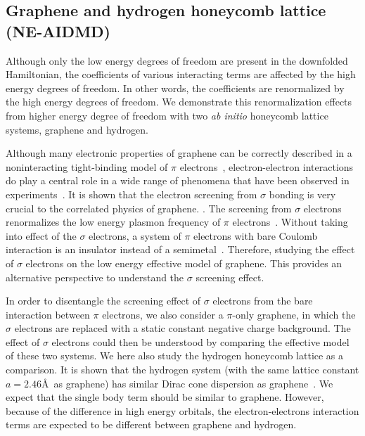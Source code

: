 %
\subsection{Graphene and hydrogen honeycomb lattice (NE-AIDMD)}
Although only the low energy degrees of freedom are present in the downfolded Hamiltonian, the coefficients of various interacting terms are affected by the high energy degrees of freedom. In other words, the coefficients are renormalized by the high energy degrees of freedom. We demonstrate this renormalization effects from higher energy degree of freedom with two \textit{ab initio} honeycomb lattice  systems, graphene and hydrogen. 

Although many electronic properties of graphene can be correctly described in a noninteracting tight-binding model of $\pi$ electrons~\cite{Castro2009}, electron-electron interactions do play a central role in a wide range of phenomena that have been observed in experiments~\cite{Kotov2012}. It is shown that the electron screening from $\sigma$ bonding is very crucial to the correlated physics of graphene. \cite{Zheng2016}. The screening from $\sigma$ electrons renormalizes the low energy plasmon frequency of $\pi$ electrons~\cite{Zheng2016}. Without taking into effect of the $\sigma$ electrons, a system of $\pi$ electrons with bare Coulomb interaction is an insulator instead of a semimetal~\cite{DrutPRL2009, DrutPRB2009,  Smith2014, Zheng2016}. Therefore, studying the effect of $\sigma$ electrons on the low energy effective model of graphene. This provides an alternative perspective to understand the $\sigma$ screening effect. 

In order to disentangle the screening effect of $\sigma$ electrons from the bare interaction between $\pi$ electrons, we also consider a $\pi$-only graphene, in which the $\sigma$ electrons are replaced with a static constant negative charge background. The effect of $\sigma$ electrons could then be understood by comparing the effective model of these two systems. 
We here also study the hydrogen honeycomb lattice as a comparison. It is shown that the hydrogen system (with the same lattice constant $a=2.46$\AA~as graphene) has similar Dirac cone dispersion as graphene~\cite{Zheng2016}. We expect that the single body term should be similar to graphene. However, because of the difference in high energy orbitals, the electron-electrons interaction terms are expected to be different between graphene and hydrogen. 

